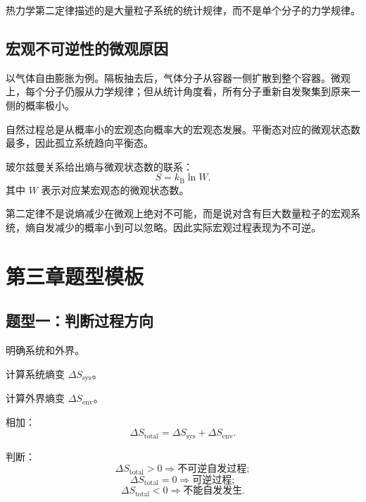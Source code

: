 热力学第二定律描述的是大量粒子系统的统计规律，而不是单个分子的力学规律。

\subsection{宏观不可逆性的微观原因}

以气体自由膨胀为例。隔板抽去后，气体分子从容器一侧扩散到整个容器。微观上，每个分子仍服从力学规律；但从统计角度看，所有分子重新自发聚集到原来一侧的概率极小。

\begin{KeyBox}[统计意义]
自然过程总是从概率小的宏观态向概率大的宏观态发展。平衡态对应的微观状态数最多，因此孤立系统趋向平衡态。
\end{KeyBox}

玻尔兹曼关系给出熵与微观状态数的联系：
\[
  \boxed{
  S=k_{\mathrm B}\ln W
  }.
\]
其中 \(W\) 表示对应某宏观态的微观状态数。

\begin{WarnBox}[第二定律的统计性质]
第二定律不是说熵减少在微观上绝对不可能，而是说对含有巨大数量粒子的宏观系统，熵自发减少的概率小到可以忽略。因此实际宏观过程表现为不可逆。
\end{WarnBox}

\section{第三章题型模板}

\subsection{题型一：判断过程方向}

\begin{MethodBox}[用总熵判断自发方向]
\begin{ReviewList}
  \item 明确系统和外界。
  \item 计算系统熵变 \(\Delta S_{\mathrm{sys}}\)。
  \item 计算外界熵变 \(\Delta S_{\mathrm{env}}\)。
  \item 相加：
  \[
    \Delta S_{\mathrm{total}}
    =
    \Delta S_{\mathrm{sys}}+\Delta S_{\mathrm{env}}.
  \]
  \item 判断：
  \[
    \Delta S_{\mathrm{total}}>0
    \Rightarrow
    \text{不可逆自发过程};
  \]
  \[
    \Delta S_{\mathrm{total}}=0
    \Rightarrow
    \text{可逆过程};
  \]
  \[
    \Delta S_{\mathrm{total}}<0
    \Rightarrow
    \text{不能自发发生}.
  \]
\end{ReviewList}
\end{MethodBox}

